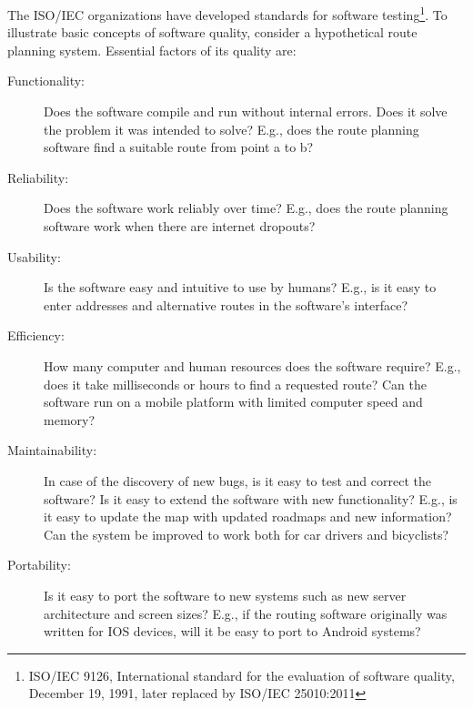 \documentclass[fsharpNotes.tex]{subfiles}
\begin{document}
The ISO/IEC organizations have developed standards for software testing\footnote{ISO/IEC 9126, International standard for the evaluation of software quality, December 19, 1991, later replaced by ISO/IEC 25010:2011}.  To illustrate basic concepts of software quality, consider a hypothetical route planning system. Essential factors of its quality are:
\begin{description}
\item[Functionality:] Does the software compile and run without internal errors. Does it solve the problem it was intended to solve? E.g., does the route planning software find a suitable route from point a to b?
\item[Reliability:] Does the software work reliably over time? E.g., does the route planning software work when there are internet dropouts?
\item[Usability:] Is the software easy and intuitive to use by humans? E.g., is it easy to enter addresses and alternative routes in the software's interface?
\item[Efficiency:] How many computer and human resources does the software require? E.g., does it take milliseconds or hours to find a requested route? Can the software run on a mobile platform with limited computer speed and memory?
\item[Maintainability:] In case of the discovery of new bugs, is it easy to test and correct the software? Is it easy to extend the software with new functionality? E.g., is it easy to update the map with updated roadmaps and new information? Can the system be improved to work both for car drivers and bicyclists? 
\item[Portability:] Is it easy to port the software to new systems such as new server architecture and screen sizes? E.g., if the routing software originally was written for IOS devices, will it be easy to port to Android systems?
\end{description}
\end{document}

